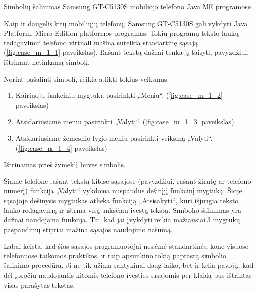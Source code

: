 \begin{xcase}{Simbolių šalinimas Samsung GT-C5130S mobiliojo telefono
              Java ME programose}
  \xcgoal
  {
    Kaip ir daugelis kitų mobiliųjų telefonų, Samsung GT-C5130S gali vykdyti
    Java Platform, Micro Edition platformos programas. Tokių programų
    teksto laukų redagavimui telefono virtuali mašina suteikia standartinę
    sąsają (\ref{fig:case_m_1_1} paveikslas). Rašant tekstą dažnai tenka jį
    taisyti, pavyzdžiui, ištrinant  netinkamą simbolį.

  }
  
  \xctools
  {
    Norint pašalinti simbolį, reikia atlikti tokius veiksmus:
    \begin{enumerate}
      \item Kairiuoju funkciniu mygtuku pasirinkti „Meniu“.
        (\ref{fig:case_m_1_2} paveikslas)
      \item Atsidariusiame meniu pasirinkti „Valyti“.
        (\ref{fig:case_m_1_3} paveikslas)
      \item Atsidariusiame žemesnio lygio meniu pasirinkti veiksmą „Valyti“.
        (\ref{fig:case_m_1_4} paveikslas)
    \end{enumerate}

    {
    }
  }
  
  \xcresult
  {
    Ištrinamas prieš žymeklį buvęs simbolis.
  }
  
  \xcprinciples
  {
    {
      Šiame telefone rašant tekstą kitose sąsajose (pavyzdžiui, rašant
      žinutę ar telefono numerį) funkcija „Valyti“ vykdoma nuspaudus
      dešinįjį funkcinį mygtuką. Šioje sąsajoje dešinysis mygtukas atlieka
      funkciją „Atsisakyti“, kuri išjungia teksto lauko redagavimą ir
      ištrina visą anksčiau įvestą tekstą.
    }
    {
      Simbolio šalinimas yra dažnai naudojama funkcija. Tai, kad jai
      įvykdyti reikia mažiausiai 3 mygtukų paspaudimų stipriai mažina
      sąsajos naudojimo našumą.
    }
  }
  
  \xcthoughts
  {
    Labai keista, kad šios sąsajos programuotojai nesiėmė standartinės, kone
    visuose telefonuose taikomos praktikos, ir taip apsunkino tokią paprastą
    simbolio šalinimo procedūrą. Ji ne tik užima santykinai daug laiko, bet
    ir kelia pavojų, kad dėl įpročių naudojantis kitomis telefono įvesties
    sąsajomis per klaidą bus ištrintas visas parašytas tekstas.
  }
\end{xcase}
